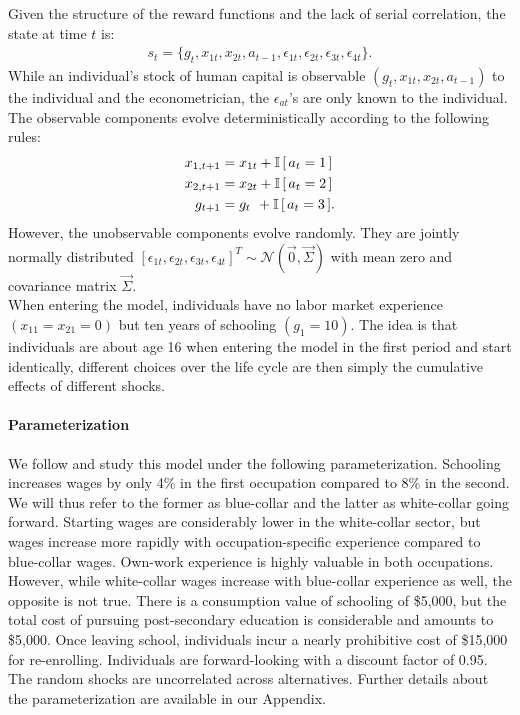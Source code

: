 \noindent Given the structure of the reward functions and the lack of serial correlation, the state at time $t$ is:
%
\begin{align*}
s_t = \{g_t,x_{1t},x_{2t},a_{t - 1},\epsilon_{1t},\epsilon_{2t},\epsilon_{3t},\epsilon_{4t}\}.
\end{align*}
%
While an individual's stock of human capital is observable $(g_t,x_{1t},x_{2t},a_{t - 1})$ to the individual and the econometrician, the $\epsilon_{at}$'s are only known to the individual. The observable components evolve deterministically according to the following rules:
%
\begin{align*}
    x_{1,t+1}  &= x_{1t} + \mathbb{I}\,[\,a_t = 1\,] \\
x_{2,t+1} &= x_{2t} + \mathbb{I}\,[\,a_t = 2\,] \\
g_{t+1}   &= g_{t\phantom{2}}    +  \mathbb{I}\,[\,a_t = 3\,].
\end{align*}
%
However, the unobservable components evolve randomly. They are jointly normally distributed  $[\epsilon_{1t}, \epsilon_{2t}, \epsilon_{3t}, \epsilon_{4t}]^T \sim \mathcal{N}(\vec{0}, \vec{\Sigma})$ with mean zero and covariance matrix $\vec{\Sigma}$.\\

\noindent When entering the model, individuals have no labor market experience $(x_{11} = x_{21} = 0)$ but ten years of schooling $(g_1 = 10)$. The idea is that individuals are about age 16 when entering the model in the first period and start identically, different choices over the life cycle are then simply the cumulative effects of different shocks.

\paragraph{Parameterization} We follow \citet{Keane.1994} and study this model under the following parameterization. Schooling increases wages by only 4\% in the first occupation compared to 8\% in the second. We will thus refer to the former as blue-collar and the latter as white-collar going forward. Starting wages are considerably lower in the white-collar sector, but wages increase more rapidly with occupation-specific experience compared to blue-collar wages. Own-work experience is highly valuable in both occupations. However, while white-collar wages increase with blue-collar experience as well, the opposite is not true. There is a consumption value of schooling of \$5,000, but the total cost of pursuing post-secondary education is considerable and amounts to \$5,000. Once leaving school, individuals incur a nearly prohibitive cost of \$15,000 for re-enrolling. Individuals are forward-looking with a discount factor of 0.95. The random shocks are uncorrelated across alternatives. Further details about the parameterization are available in our Appendix.

